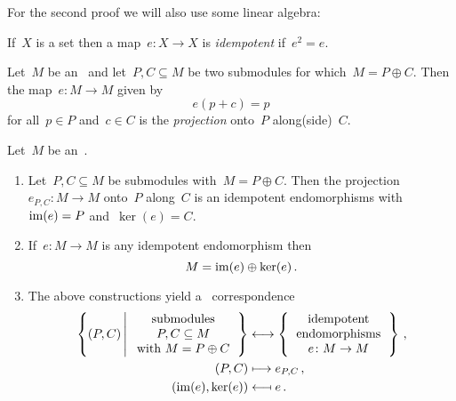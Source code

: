For the second proof we will also use some linear algebra:

\begin{definition}
  If~$X$ is a set then a map~$e \colon X \to X$ is \emph{idempotent} if~$e^2 = e$.
\end{definition}

\begin{definition}
  Let~$M$ be an~{} and let~$P, C \subseteq M$ be two submodules for which~$M = P \oplus C$.
  Then the map~$e \colon M \to M$ given by
  \[
      e(p + c)
    = p
  \]
  for all~$p \in P$ and~$c \in C$ is the \emph{projection} onto~$P$ along(side)~$C$.
\end{definition}


\begin{recall}
  Let~$M$ be an~{}.
  \begin{enumerate}
    \item
      Let~$P, C \subseteq M$ be submodules with~$M = P \oplus C$.
      Then the projection~$e_{P,C} \colon M \to M$ onto~$P$ along~$C$ is an idempotent endomorphisms with~$\operatorname{im}(e) = P$ and~$\ker(e) = C$.
    \item
      If~$e \colon M \to M$ is any idempotent endomorphism then
      \[
        M = \operatorname{im}(e) \oplus \ker(e) \,.
      \]
    \item
      The above constructions yield a~{\onetoone} correspondence
      \begin{align*}
          \left\{
            (P,C)
          \suchthat*
            \begin{tabular}{c}
              submodules  \\
              $P, C \subseteq M$  \\
              with~$M = P \oplus C$
            \end{tabular}
          \right\}
        &\longleftrightarrow
          \left\{
            \begin{tabular}{c}
              idempotent  \\
              endomorphisms \\
              $e \colon M \to M$
            \end{tabular}
          \right\} \,,
          \\
            (P,C)
          &\longmapsto
            e_{P,C} \,,
          \\
            (\im(e), \ker(e))
          &\longmapsfrom
            e \,.
      \end{align*}
  \end{enumerate}
\end{recall}


